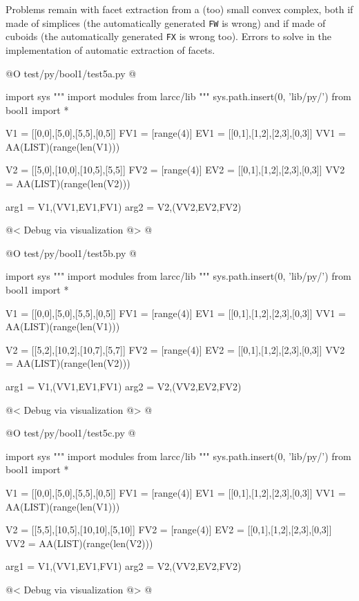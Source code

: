 \documentclass[11pt,oneside]{article}	%
\begin{document}
Problems remain with facet extraction from a (too) small convex complex, both if made of simplices
(the automatically generated \texttt{FW} is wrong) and if made of cuboids
(the automatically generated \texttt{FX} is wrong too). Errors to solve in the implementation of automatic extraction of facets.

@O test/py/bool1/test5a.py
@{
import sys
""" import modules from larcc/lib """
sys.path.insert(0, 'lib/py/')
from bool1 import *

V1 = [[0,0],[5,0],[5,5],[0,5]]
FV1 = [range(4)]
EV1 = [[0,1],[1,2],[2,3],[0,3]]
VV1 = AA(LIST)(range(len(V1)))

V2 = [[5,0],[10,0],[10,5],[5,5]]
FV2 = [range(4)]
EV2 = [[0,1],[1,2],[2,3],[0,3]]
VV2 = AA(LIST)(range(len(V2)))

arg1 = V1,(VV1,EV1,FV1)
arg2 = V2,(VV2,EV2,FV2)

@< Debug via visualization @>
@}
@O test/py/bool1/test5b.py
@{
import sys
""" import modules from larcc/lib """
sys.path.insert(0, 'lib/py/')
from bool1 import *

V1 = [[0,0],[5,0],[5,5],[0,5]]
FV1 = [range(4)]
EV1 = [[0,1],[1,2],[2,3],[0,3]]
VV1 = AA(LIST)(range(len(V1)))

V2 = [[5,2],[10,2],[10,7],[5,7]]
FV2 = [range(4)]
EV2 = [[0,1],[1,2],[2,3],[0,3]]
VV2 = AA(LIST)(range(len(V2)))

arg1 = V1,(VV1,EV1,FV1)
arg2 = V2,(VV2,EV2,FV2)

@< Debug via visualization @>
@}
@O test/py/bool1/test5c.py
@{
import sys
""" import modules from larcc/lib """
sys.path.insert(0, 'lib/py/')
from bool1 import *

V1 = [[0,0],[5,0],[5,5],[0,5]]
FV1 = [range(4)]
EV1 = [[0,1],[1,2],[2,3],[0,3]]
VV1 = AA(LIST)(range(len(V1)))

V2 = [[5,5],[10,5],[10,10],[5,10]]
FV2 = [range(4)]
EV2 = [[0,1],[1,2],[2,3],[0,3]]
VV2 = AA(LIST)(range(len(V2)))

arg1 = V1,(VV1,EV1,FV1)
arg2 = V2,(VV2,EV2,FV2)

@< Debug via visualization @>
@}
\end{document}
